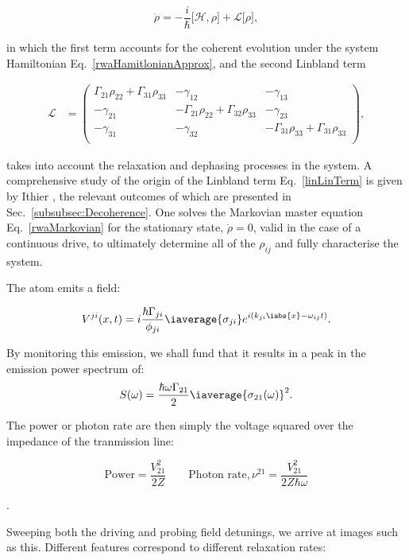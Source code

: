   \begin{equation}
  \dot{\rho} = -\frac{i}{\hbar}\big[\mathcal{H},\rho\big]+\mathcal{L}\big[\rho\big],
  \label{rwaMarkovian}
  \end{equation}
  
  \noindent in which the first term accounts for the coherent evolution under the system Hamiltonian Eq.~\eqref{rwaHamitlonianApprox}, and the second Linbland term
  
  \begin{equation}
  \label{linLinTerm}
  \begin{aligned}
  \mathcal{L} & = \begin{pmatrix}
  \Gamma_{21}\rho_{22} + \Gamma_{31}\rho_{33} & -\gamma_{12} & -\gamma_{13}\\
  -\gamma_{21} & -\Gamma_{21}\rho_{22} + \Gamma_{32}\rho_{33} & -\gamma_{23}\\
  -\gamma_{31} & -\gamma_{32} & -\Gamma_{31}\rho_{33} + \Gamma_{31}\rho_{33}\\
  \end{pmatrix},
  \end{aligned}
  \end{equation}
  
  \noindent takes into account the relaxation and dephasing processes in the system. A comprehensive study of the origin of the Linbland term Eq.~\eqref{linLinTerm} is given by Ithier \cite{ithier}, the relevant outcomes of which are presented in Sec.~\ref{subsubsec:Decoherence}. One solves the Markovian master equation Eq.~\eqref{rwaMarkovian} for the stationary state, $ \dot{\rho}=0 $, valid in the case of a continuous drive, to ultimately determine all of the $ \rho_{ij} $ and fully characterise the system.
  
  The atom emits a field:
  
  \[
  	V^{ji}(x,t) = i\frac{\hbar\Gamma_{ji}}{\phi_{ji}}\iaverage{\sigma_{ji}}e^{i\left(k_{ji}\iabs{x}-\omega_{ij}t\right)}.
  \]
  
  \noindent By monitoring this emission, we shall fund that it results in a peak in the emission power spectrum of:
  \[
  	S(\omega) = \frac{\hbar\omega\Gamma_{21}}{2}\iaverage{\sigma_{21}(\omega)}^2.
  \]
  
  \noindent The power or photon rate are then simply the voltage squared over the impedance of the tranmission line:
  
  
  \[
  	\text{Power} = \frac{V_{21}^2}{2Z} \quad\quad \text{Photon rate}, \nu^{21} = \frac{V_{21}^2}{2Z\hbar\omega}
  \]
  
  .
  
  Sweeping both the driving and probing field detunings, we arrive at images such as this. Different features correspond to different relaxation rates:
  
  
  \newpage
 